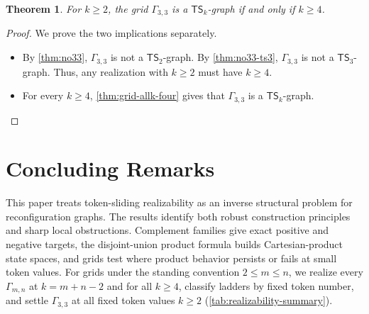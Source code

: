 \documentclass[a4paper]{article}
\theoremstyle{plain}
\newtheorem{theorem}{Theorem}[section]
\theoremstyle{definition}
\newcommand{\TSsym}{\mathsf{TS}}
\numberwithin{equation}{section}
\begin{document}
\begin{theorem}
\label{thm:gamma33-fixed-k}
For $k\ge 2$, the grid $\Gamma_{3,3}$ is a $\TSsym_k$-graph if and only if $k\ge 4$.
\end{theorem}

\begin{proof}
We prove the two implications separately.
\begin{itemize}
\item[$(\Rightarrow)$]
By \cref{thm:no33}, $\Gamma_{3,3}$ is not a $\TSsym_2$-graph.
By \cref{thm:no33-ts3}, $\Gamma_{3,3}$ is not a $\TSsym_3$-graph.
Thus, any realization with $k\ge 2$ must have $k\ge 4$.

\item[$(\Leftarrow)$]
For every $k\ge 4$, \cref{thm:grid-allk-four} gives that $\Gamma_{3,3}$ is a $\TSsym_k$-graph.
\end{itemize}
\end{proof}


\section{Concluding Remarks}
\label{sec:conclusion}

This paper treats token-sliding realizability as an inverse structural problem for reconfiguration graphs.
The results identify both robust construction principles and sharp local obstructions.
Complement families give exact positive and negative targets, the disjoint-union product formula builds Cartesian-product state spaces, and grids test where product behavior persists or fails at small token values.
For grids under the standing convention $2\le m\le n$, we realize every $\Gamma_{m,n}$ at $k=m+n-2$ and for all $k\ge 4$, classify ladders by fixed token number, and settle $\Gamma_{3,3}$ at all fixed token values $k\ge 2$ (\cref{tab:realizability-summary}).
\end{document}
